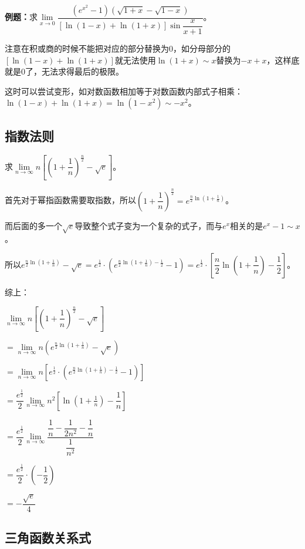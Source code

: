 \textbf{例题：}求$\lim\limits_{x\to 0}\dfrac{(e^{x^2}-1)(\sqrt{1+x}-\sqrt{1-x})}{[\ln(1-x)+\ln(1+x)]\sin\dfrac{x}{x+1}}$。

注意在积或商的时候不能把对应的部分替换为0，如分母部分的$[\ln(1-x)+\ln(1+x)]$就无法使用$\ln(1+x)\sim x$替换为$-x+x$，这样底就是0了，无法求得最后的极限。

这时可以尝试变形，如对数函数相加等于对数函数内部式子相乘：$\ln(1-x)+\ln(1+x)=\ln(1-x^2)\sim-x^2$。

\subsection{指数法则}

求$\lim\limits_{n\to\infty}n\left[\left(1+\dfrac{1}{n}\right)^{\frac{n}{2}}-\sqrt{e}\right]$。

首先对于幂指函数需要取指数，所以$\left(1+\dfrac{1}{n}\right)^{\frac{n}{2}}=e^{\frac{n}{2}\ln(1+\frac{1}{n})}$。\medskip

而后面的多一个$\sqrt{e}$导致整个式子变为一个复杂的式子，而与$e^x$相关的是$e^x-1\sim x$。

所以$e^{\frac{n}{2}\ln(1+\frac{1}{n})}-\sqrt{e}=e^{\frac{1}{2}}\cdot\left(e^{\frac{n}{2}\ln(1+\frac{1}{n})-\frac{1}{2}}-1\right)=e^{\frac{1}{2}}\cdot\left[\dfrac{n}{2}\ln(1+\dfrac{1}{n})-\dfrac{1}{2}\right]$。

综上：

$\lim\limits_{n\to\infty}n\left[\left(1+\dfrac{1}{n}\right)^{\frac{n}{2}}-\sqrt{e}\right]$ \medskip

$=\lim\limits_{n\to\infty}n\left(e^{\frac{n}{2}\ln(1+\frac{1}{n})}-\sqrt{e}\right)$ \medskip

$=\lim\limits_{n\to\infty}n\left[e^{\frac{1}{2}}\cdot\left(e^{\frac{n}{2}\ln(1+\frac{1}{n})-\frac{1}{2}}-1\right)\right]$ \medskip

$=\dfrac{e^{\frac{1}{2}}}{2}\lim\limits_{n\to\infty}n^2\left[\ln\left(1+\frac{1}{n}\right)-\dfrac{1}{n}\right]$

$=\dfrac{e^{\frac{1}{2}}}{2}\lim\limits_{n\to\infty}\dfrac{\dfrac{1}{n}-\dfrac{1}{2n^2}-\dfrac{1}{n}}{\dfrac{1}{n^2}}$

$=\dfrac{e^{\frac{1}{2}}}{2}\cdot\left(-\dfrac{1}{2}\right)$

$=-\dfrac{\sqrt{e}}{4}$

\subsection{三角函数关系式}

